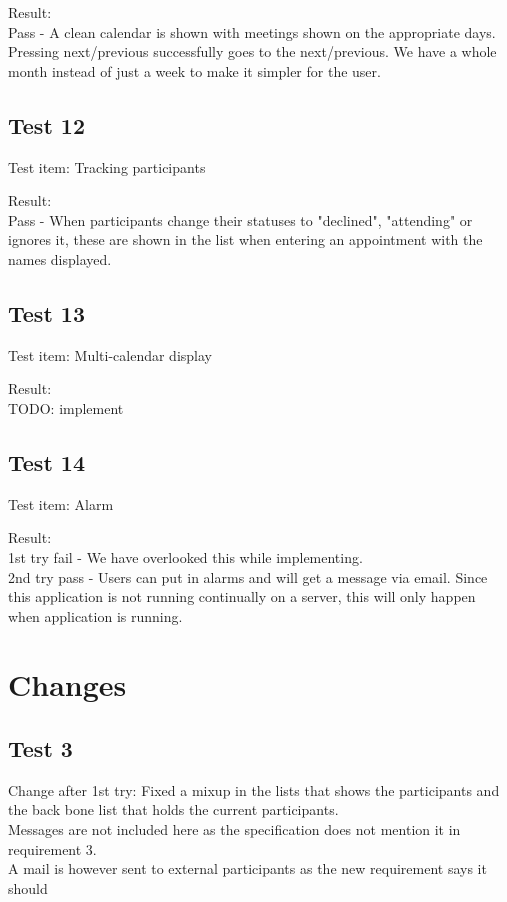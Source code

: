 Result: \\Pass - A clean calendar is shown with meetings shown on the appropriate days. Pressing next/previous successfully goes to the next/previous. We have a whole month instead of just a week to make it simpler for the user.

\subsection{Test 12}
Test item: Tracking participants

Result: \\Pass - When participants change their statuses to "declined", "attending" or ignores it, these are shown in the list when entering an appointment with the names displayed.

\subsection{Test 13}
Test item: Multi-calendar display

Result: \\TODO: implement

\subsection{Test 14}
Test item: Alarm

Result: \\1st try fail - We have overlooked this while implementing.\\
2nd try pass - Users can put in alarms and will get a message via email. Since this application is not running continually on a server, this will only happen when application is running.

\section{Changes}
\subsection{Test 3}
Change after 1st try: Fixed a mixup in the lists that shows the participants and the back bone list that holds the current participants.\\
Messages are not included here as the specification does not mention it in requirement 3.\\
A mail is however sent to external participants as the new requirement says it should

